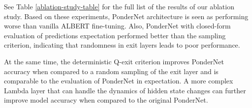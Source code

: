 \documentclass{article}
\begin{document}
\begin{table}
\vskip 0.1in
\centering
{}
\caption{A comparison of PRoBERTa with recent approaches on the GLUE benchmark.  In the Macro column, we present the average results across tasks. We bolded the best results. Note that we did not bold the RoBERTa rows since there is no early exit applied and we reported it for reference.}
\label{glue-dev-roberta}
\end{table}

See Table \ref{ablation-study-table} for the full list of the results of our ablation study. Based on these experiments, PonderNet architecture is seen as performing worse than vanilla ALBERT fine-tuning. Also, PonderNet with closed-form evaluation of predictions expectation performed better than the sampling criterion, indicating that randomness in exit layers leads to poor performance. 

At the same time, the deterministic Q-exit criterion improves PonderNet accuracy when compared to a random sampling of the exit layer and is comparable to the evaluation of PonderNet in expectation. A more complex Lambda layer that can handle the dynamics of hidden state changes can further improve model accuracy when compared to the original PonderNet.
\end{document}
